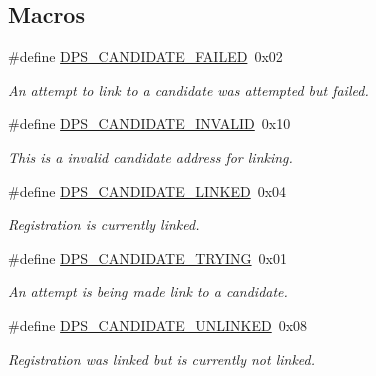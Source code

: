 \subsection*{Macros}
\begin{DoxyCompactItemize}
\item 
\mbox{\label{group__registration_gafde6e5d4cc3e65a94afdd30a689221d5}} 
\#define \hyperlink{group__registration_gafde6e5d4cc3e65a94afdd30a689221d5}{D\+P\+S\+\_\+\+C\+A\+N\+D\+I\+D\+A\+T\+E\+\_\+\+F\+A\+I\+L\+ED}~0x02
\begin{DoxyCompactList}\small\item\em An attempt to link to a candidate was attempted but failed. \end{DoxyCompactList}\item 
\mbox{\label{group__registration_gae27a3dfd1f2e746220e99921f2c33a6c}} 
\#define \hyperlink{group__registration_gae27a3dfd1f2e746220e99921f2c33a6c}{D\+P\+S\+\_\+\+C\+A\+N\+D\+I\+D\+A\+T\+E\+\_\+\+I\+N\+V\+A\+L\+ID}~0x10
\begin{DoxyCompactList}\small\item\em This is a invalid candidate address for linking. \end{DoxyCompactList}\item 
\mbox{\label{group__registration_ga243eb1f49d56c2ae1f542a0c95a5a52d}} 
\#define \hyperlink{group__registration_ga243eb1f49d56c2ae1f542a0c95a5a52d}{D\+P\+S\+\_\+\+C\+A\+N\+D\+I\+D\+A\+T\+E\+\_\+\+L\+I\+N\+K\+ED}~0x04
\begin{DoxyCompactList}\small\item\em Registration is currently linked. \end{DoxyCompactList}\item 
\mbox{\label{group__registration_ga06a44e56022098c9464bd881cf5efe20}} 
\#define \hyperlink{group__registration_ga06a44e56022098c9464bd881cf5efe20}{D\+P\+S\+\_\+\+C\+A\+N\+D\+I\+D\+A\+T\+E\+\_\+\+T\+R\+Y\+I\+NG}~0x01
\begin{DoxyCompactList}\small\item\em An attempt is being made link to a candidate. \end{DoxyCompactList}\item 
\mbox{\label{group__registration_ga0564134dd21bdecf8e8e25cf832e2a38}} 
\#define \hyperlink{group__registration_ga0564134dd21bdecf8e8e25cf832e2a38}{D\+P\+S\+\_\+\+C\+A\+N\+D\+I\+D\+A\+T\+E\+\_\+\+U\+N\+L\+I\+N\+K\+ED}~0x08
\begin{DoxyCompactList}\small\item\em Registration was linked but is currently not linked. \end{DoxyCompactList}\end{DoxyCompactItemize}
